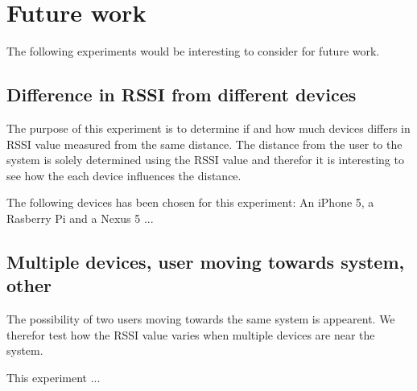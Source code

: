 \section{Future work}
The following experiments would be interesting to consider for future work.


\subsection{Difference in RSSI from different devices}
The purpose of this experiment is to determine if and how much devices differs in RSSI value measured from the same distance. The distance from the user to the system is solely determined using the RSSI value and therefor it is interesting to see how the each device influences the distance.
	
The following devices has been chosen for this experiment: An iPhone 5, a Rasberry Pi and a Nexus 5 ... 



\subsection{Multiple devices, user moving towards system, other}
The possibility of two users moving towards the same system is appearent. We therefor test how the RSSI value varies when multiple devices are near the system.

This experiment ...